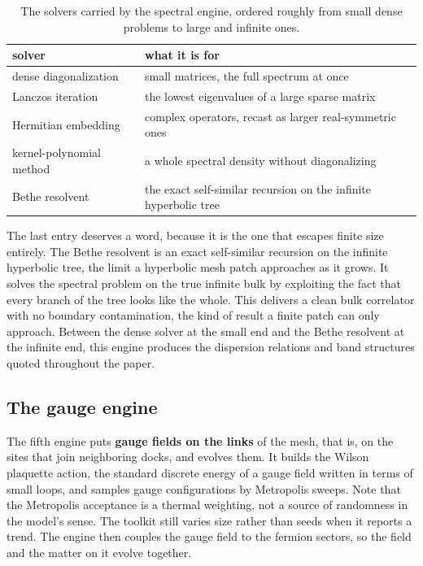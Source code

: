 \begin{table}[ht]
\centering
\begin{tabular}{@{}ll@{}}
\toprule
solver & what it is for \\
\midrule
dense diagonalization & small matrices, the full spectrum at once \\
Lanczos iteration & the lowest eigenvalues of a large sparse matrix \\
Hermitian embedding & complex operators, recast as larger real-symmetric ones \\
kernel-polynomial method & a whole spectral density without diagonalizing \\
Bethe resolvent & the exact self-similar recursion on the infinite hyperbolic tree \\
\bottomrule
\end{tabular}
\caption{The solvers carried by the spectral engine, ordered roughly from small dense problems to large and infinite ones.}
\label{tab:spectral-solvers}
\end{table}

The last entry deserves a word, because it is the one that escapes finite size entirely. The Bethe resolvent is an exact self-similar recursion on the infinite hyperbolic tree, the limit a hyperbolic mesh patch approaches as it grows. It solves the spectral problem on the true infinite bulk by exploiting the fact that every branch of the tree looks like the whole. This delivers a clean bulk correlator with no boundary contamination, the kind of result a finite patch can only approach. Between the dense solver at the small end and the Bethe resolvent at the infinite end, this engine produces the dispersion relations and band structures quoted throughout the paper.

\subsection{The gauge engine}

The fifth engine puts \textbf{gauge fields on the links} of the mesh, that is, on the sites that join neighboring docks, and evolves them. It builds the Wilson plaquette action, the standard discrete energy of a gauge field written in terms of small loops, and samples gauge configurations by Metropolis sweeps. Note that the Metropolis acceptance is a thermal weighting, not a source of randomness in the model's sense. The toolkit still varies size rather than seeds when it reports a trend. The engine then couples the gauge field to the fermion sectors, so the field and the matter on it evolve together.

